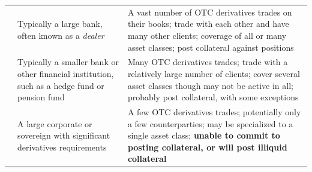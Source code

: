 \begin{center}
\footnotesize
\begin{tabular}{L{2.5cm} L{5.9cm} L{6.1cm}}
\toprule
{} &  &  \\
\midrule
{} & Typically a large bank, often known as a
  \emph{dealer} &
  A vast number of OTC derivatives trades on their books; trade with each other
  and have many other clients; coverage of all or many asset classes; post
  collateral against positions \\
 & Typically a smaller bank or other financial
  institution, such as a hedge fund or pension fund &
  Many OTC derivatives trades; trade with a relatively large number of clients;
  cover several asset classes though may not be active in all; probably post
  collateral, with some exceptions \\
 & A large corporate or sovereign with significant
  derivatives requirements &
  A few OTC derivatives trades; potentially only a few counterparties; may be
  specialized to a single asset class; \textbf{unable to commit to posting
  collateral, or will post illiquid collateral} \\
\bottomrule
\end{tabular}
\end{center}


